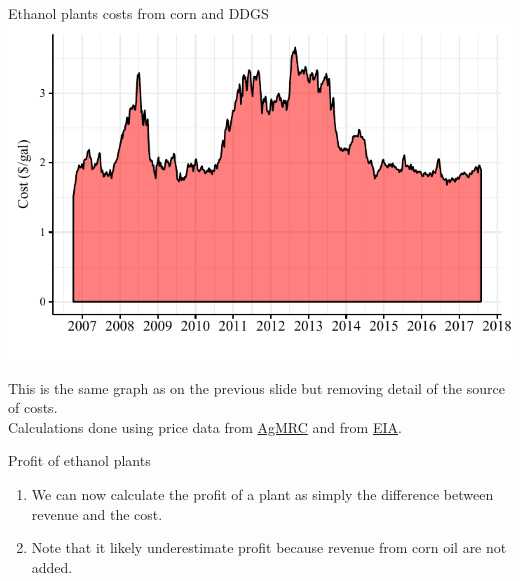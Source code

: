 \documentclass[table,xcolor=pdftex,dvipsnames]{beamer}\usepackage[]{graphicx}\usepackage[]{color}
\makeatletter
\def\maxwidth{ %
  \ifdim\Gin@nat@width>\linewidth
    \linewidth
  \else
    \Gin@nat@width
  \fi
}
\newenvironment{knitrout}{}{} %
\makeatother
\begin{document}
\begin{frame}{Ethanol plants costs from corn and DDGS}
\begin{knitrout}
\color{fgcolor}
\includegraphics[width=\maxwidth]{figure/figure_cost2-1} 

\end{knitrout}
\vspace{-1\baselineskip}
\scriptsize
This is the same graph as on the previous slide but removing detail of the source of costs.\\
Calculations done using price data from \href{http://www.extension.iastate.edu/agdm/energy/xls/agmrcethanolplantprices.xlsx}{AgMRC} and from \href{http://www.eia.gov/dnav/ng/ng_pri_sum_dcu_sia_m.htm}{EIA}.
\end{frame}


\begin{frame}{Profit of ethanol plants}
\begin{enumerate}[label=\textbullet]
    \item We can now calculate the profit of a plant as simply the difference between revenue and the cost.
    \item Note that it likely underestimate profit because revenue from corn oil are not added.
\end{enumerate}
\end{frame}

\end{document}
